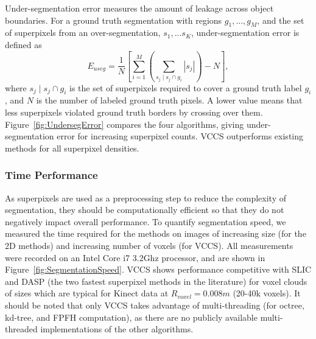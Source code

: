 Under-segmentation error measures the amount of leakage across object boundaries. For a ground truth segmentation with regions $g_1,...,g_M$, and the set of superpixels from an over-segmentation, $s_1,...s_K$, under-segmentation error is defined as 
\begin{equation}
\label{eqn:UndersegError}
{E}_{useg}=\frac{1}{N} \left[ \sum_{i=1}^{M}{\left(\sum_{s_j \mid s_j \cap g_i}{|s_j|}\right)-N} \right],
\end{equation}
where $s_j \mid s_j \cap g_i$ is the set of superpixels required to cover a ground truth label $g_i$, and $N$ is the number of labeled ground truth pixels. A lower value means that less superpixels violated ground truth borders by crossing over them. Figure~\ref{fig:UndersegError} compares the four algorithms, giving under-segmentation error for increasing superpixel counts. VCCS outperforms existing methods for all superpixel densities. 

\subsubsection{Time Performance}
As superpixels are used as a preprocessing step to reduce the complexity of segmentation, they should be computationally efficient so that they do not negatively impact overall performance. To quantify segmentation speed, we measured the time required for the methods on images of increasing size (for the 2D methods) and increasing number of voxels (for VCCS). All measurements were recorded on an Intel Core i7 3.2Ghz processor, and are shown in Figure~\ref{fig:SegmentationSpeed}. VCCS shows performance competitive with SLIC and DASP (the two fastest superpixel methods in the literature) for voxel clouds of sizes which are typical for Kinect data at ${R}_{voxel}=0.008m$ (20-40k voxels). It should be noted that only VCCS takes advantage of multi-threading (for octree, kd-tree, and FPFH computation), as there are no publicly available multi-threaded implementations of the other algorithms.  

